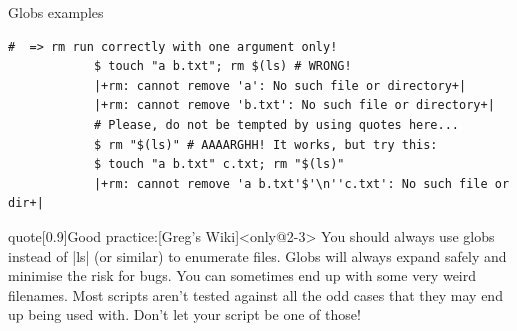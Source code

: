 \begin{frame}[fragile]{Globs examples}
\begin{onlyenv}
\begin{lstlisting}[style=MyBash, style=oddnumbers, xleftmargin=3mm, xrightmargin=3mm, firstnumber=32]
                       #  => rm run correctly with one argument only!
            $ touch "a b.txt"; rm $(ls) # WRONG!
            |+rm: cannot remove 'a': No such file or directory+|
            |+rm: cannot remove 'b.txt': No such file or directory+|
            # Please, do not be tempted by using quotes here...
            $ rm "$(ls)" # AAAARGHH! It works, but try this:
            $ touch "a b.txt" c.txt; rm "$(ls)"
            |+rm: cannot remove 'a b.txt'$'\n''c.txt': No such file or dir+|
        \end{lstlisting}
    \end{onlyenv}
    \vspace{1mm}
    \begin{varblock}{quote}[0.9\textwidth]{Good practice:}[Greg's Wiki]<only@2-3>
        You should always use globs instead of \textnormal{\bash|ls|} (or similar) to enumerate files.
        Globs will always expand safely and minimise the risk for bugs.
        You can sometimes end up with some very weird filenames.
        Most scripts aren't tested against all the odd cases that they may end up being used with.
        \alert{Don't let your script be one of those!}\\[-0.7em] ~
    \end{varblock}
\end{frame}
